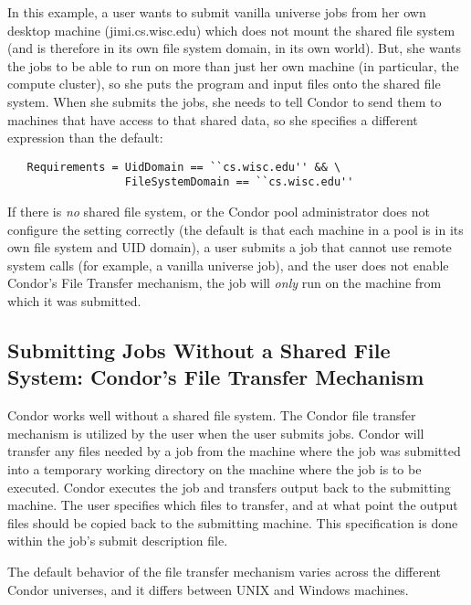 In this example,
a user wants to submit vanilla universe jobs from her own desktop
machine (jimi.cs.wisc.edu) which does not mount the shared file system
(and is therefore in its own file system domain, in its own world).
But, she wants the jobs to be able to run on more than just her own
machine (in particular, the compute cluster), so she puts the program
and input files onto the shared file system.
When she submits the jobs, she needs to tell Condor to send them to
machines that have access to that shared data, so she specifies a
different  expression than the default:
\begin{verbatim}
   Requirements = UidDomain == ``cs.wisc.edu'' && \
                  FileSystemDomain == ``cs.wisc.edu''
\end{verbatim}

\Warn If there is \emph{no} shared file system, or the Condor pool
administrator does not configure the \AdAttr{FileSystemDomain}
setting correctly (the default is that each machine in a pool is in
its own file system and UID domain), a user submits a job that cannot
use remote system calls (for example, a vanilla universe job), and the
user does not enable Condor's File Transfer mechanism, the job will
\emph{only} run on the machine from which it was submitted.


\subsection{\label{sec:file-transfer}
Submitting Jobs Without a Shared File System:
Condor's File Transfer Mechanism} 

Condor works well without a shared file system.
The Condor file transfer mechanism is utilized by the user
when the user submits jobs.
Condor will transfer any files needed by a job from
the machine where the job was submitted into a
temporary working directory on the machine where the
job is to be executed.
Condor executes the job
and transfers output back to the submitting machine.
The user specifies which files to transfer,
and at what point the output files should be copied back to the
submitting machine.
This specification is done within the job's submit description file.

The default behavior of the file transfer mechanism
varies across the
different Condor universes, and it differs between UNIX and Windows machines.

